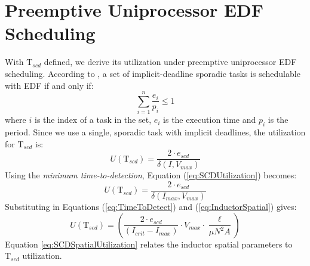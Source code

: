 \documentclass[11pt,compsoc,oneside]{report}
\begin{document}
\section{Preemptive Uniprocessor EDF Scheduling}
With $\mathrm{T}_{scd}$ defined, we derive its utilization under preemptive uniprocessor EDF scheduling. According to \cite{LiuLayland}, a set of implicit-deadline sporadic tasks is schedulable with EDF if and only if:
\begin{equation}\label{eq:EDFUtilization}
\sum_{i=1}^{n} \frac{e_{i}}{p_{i}} \leq 1
\end{equation}
where $i$ is the index of a task in the set, $e_{i}$ is the execution time and $p_{i}$ is the period. Since we use a single, sporadic task with implicit deadlines, the utilization for $\mathrm{T}_{scd}$ is:
\begin{equation}\label{eq:SCDUtilization}
U(\mathrm{T}_{scd}) = \frac{2 \cdot e_{scd}}{\delta(I,V_{max})}
\end{equation}
Using the \textit{minimum time-to-detection}, Equation (\ref{eq:SCDUtilization}) becomes:
\begin{equation}\label{eq:SCDMinUtilization}
U(\mathrm{T}_{scd}) = \frac{2 \cdot e_{scd}}{\delta(I_{max},V_{max})}
\end{equation}
Substituting in Equations (\ref{eq:TimeToDetect}) and (\ref{eq:InductorSpatial}) gives:
\begin{equation}\label{eq:SCDSpatialUtilization}
U(\mathrm{T}_{scd}) = (\frac{2 \cdot e_{scd}}{(I_{crit}-I_{max})} \cdot V_{max} \cdot \frac{\ell}{\mu N^{2}A})
\end{equation}
Equation \ref{eq:SCDSpatialUtilization} relates the inductor spatial parameters to $\mathrm{T}_{scd}$ utilization.

\end{document}
